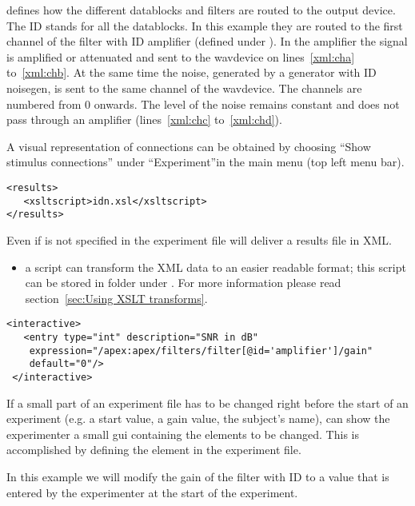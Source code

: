 
 defines how the different datablocks and
filters are routed to the output device. The ID  stands
for all the datablocks. In this example they are routed to the
first channel of the filter with ID {amplifier} (defined under
). In the amplifier the signal is amplified or
attenuated and sent to the wavdevice on lines~\ref{xml:cha}
to~\ref{xml:chb}. At the same time the noise, generated by a
generator with ID noisegen, is sent to the same channel of the
wavdevice. The channels are numbered from 0 onwards. The level of
the noise remains constant and does not pass through an amplifier
(lines~\ref{xml:chc} to~\ref{xml:chd}).

A visual representation of connections can be obtained by choosing
``Show stimulus connections'' under ``Experiment''in the main
\apex menu (top left menu bar).



\begin{lstlisting}
<results>
   <xsltscript>idn.xsl</xsltscript>
</results>
\end{lstlisting}

Even if  is not specified in the experiment file
\apex will deliver a results file in XML.
\begin{itemize}
\item {}  a script can transform the XML data to
an easier readable format; this script can be stored in folder
 under \apex. For more information please read
section~\ref{sec:Using XSLT transforms}.
\end{itemize}
 

\begin{lstlisting}
<interactive>
   <entry type="int" description="SNR in dB"
    expression="/apex:apex/filters/filter[@id='amplifier']/gain"
    default="0"/>
 </interactive>
\end{lstlisting}

If a small part of an experiment file has to be changed right
before the start of an experiment (e.g. a start value, a gain
value, the subject's name), \apex can show the experimenter a
small \ac{gui} containing the elements to be changed. This is
accomplished by defining the  element in the
experiment file.

In this example we will modify the gain of the filter with ID
 to a value that is entered by the experimenter at
the start of the experiment.

